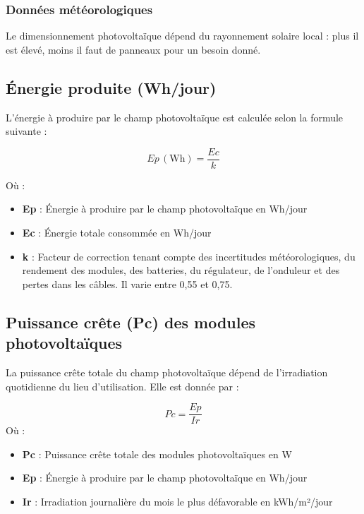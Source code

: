 \subsubsection{Données météorologiques}  
Le dimensionnement photovoltaïque dépend du rayonnement solaire local : plus il est élevé, moins il faut de panneaux pour un besoin donné.

\subsection{Énergie produite (Wh/jour)}

L'énergie à produire par le champ photovoltaïque est calculée selon la formule suivante :

\begin{equation}
Ep \, (\text{Wh}) = \frac{Ec}{k}
\end{equation}

Où :

\begin{itemize}
	\item \textbf{Ep} : Énergie à produire par le champ photovoltaïque en Wh/jour
	\item \textbf{Ec} : Énergie totale consommée en Wh/jour
\item \textbf{k} : Facteur de correction tenant compte des incertitudes météorologiques, du rendement des modules, des batteries, du régulateur, de l'onduleur et des pertes dans les câbles. Il varie entre 0,55 et 0,75.

\end{itemize}

\subsection{Puissance crête (Pc) des modules photovoltaïques}

La puissance crête totale du champ photovoltaïque dépend de l'irradiation quotidienne du lieu d'utilisation. Elle est donnée par :

\begin{equation}
Pc = \frac{Ep}{Ir}
\end{equation}
Où :

\begin{itemize}
	\item \textbf{Pc} : Puissance crête totale des modules photovoltaïques en W
	\item \textbf{Ep} : Énergie à produire par le champ photovoltaïque en Wh/jour
	\item \textbf{Ir} : Irradiation journalière du mois le plus défavorable en kWh/m²/jour
\end{itemize}

